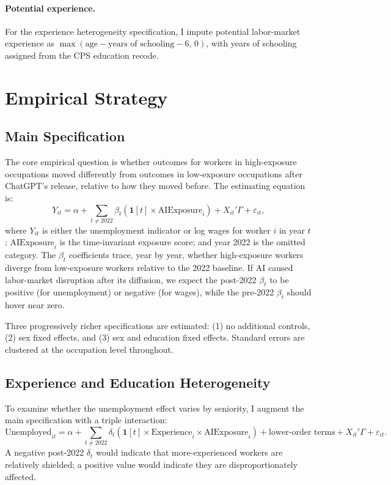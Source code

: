 \documentclass[11pt]{article}
\begin{document}
\paragraph{Potential experience.} For the experience heterogeneity specification, I impute potential labor-market experience as $\max(\text{age} - \text{years of schooling} - 6,\, 0)$, with years of schooling assigned from the CPS education recode.

\section{Empirical Strategy}
\label{sec:strategy}

\subsection{Main Specification}

The core empirical question is whether outcomes for workers in high-exposure occupations moved differently from outcomes in low-exposure occupations after ChatGPT's release, relative to how they moved before. The estimating equation is:
\begin{equation}
\label{eq:main}
Y_{it} = \alpha
  + \sum_{t \neq 2022} \beta_t \left( \mathbf{1}[t] \times \text{AIExposure}_i \right)
  + X_{it}'\Gamma + \varepsilon_{it},
\end{equation}
where $Y_{it}$ is either the unemployment indicator or log wages for worker $i$ in year $t$; $\text{AIExposure}_i$ is the time-invariant exposure score; and year 2022 is the omitted category. The $\beta_t$ coefficients trace, year by year, whether high-exposure workers diverge from low-exposure workers relative to the 2022 baseline. If AI caused labor-market disruption after its diffusion, we expect the post-2022 $\beta_t$ to be positive (for unemployment) or negative (for wages), while the pre-2022 $\beta_t$ should hover near zero.

Three progressively richer specifications are estimated: (1) no additional controls, (2) sex fixed effects, and (3) sex and education fixed effects. Standard errors are clustered at the occupation level throughout.

\subsection{Experience and Education Heterogeneity}

To examine whether the unemployment effect varies by seniority, I augment the main specification with a triple interaction:
\begin{equation}
\label{eq:triple}
\text{Unemployed}_{it} = \alpha
  + \sum_{t \neq 2022} \delta_t \left( \mathbf{1}[t] \times \text{Experience}_i \times \text{AIExposure}_i \right)
  + \text{lower-order terms} + X_{it}'\Gamma + \varepsilon_{it}.
\end{equation}
A negative post-2022 $\delta_t$ would indicate that more-experienced workers are relatively shielded; a positive value would indicate they are disproportionately affected.
\end{document}
